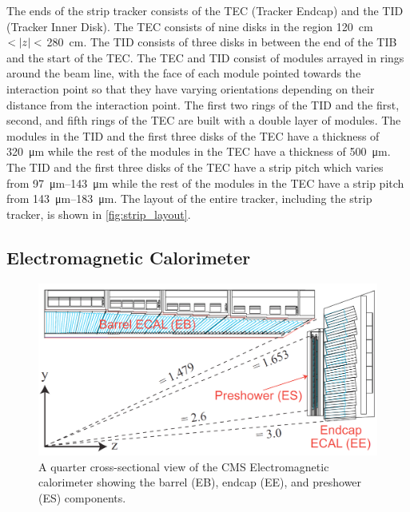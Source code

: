 The ends of the strip tracker consists of the TEC (Tracker Endcap) and the TID
(Tracker Inner Disk). The TEC consists of nine disks in the region
\SI{120}{\centi\meter} $< |z| <$ \SI{280}{\centi\meter}. The TID consists
of three disks in between the end of the TIB and the start of the TEC. The TEC
and TID consist of modules arrayed in rings around the beam line, with the face
of each module pointed towards the interaction point so that they have varying
orientations depending on their distance from the interaction point. The first
two rings of the TID and the first, second, and fifth rings of the TEC are
built with a double layer of modules. The modules in the TID and the first
three disks of the TEC have a thickness of \SI{320}{\micro\meter} while the
rest of the modules in the TEC have a thickness of \SI{500}{\micro\meter}. The
TID and the first three disks of the TEC have a strip pitch which varies from
\SIrange{97}{143}{\micro\meter} while the rest of the modules in the TEC have a
strip pitch from \SIrange{143}{183}{\micro\meter}. The layout of the entire
tracker, including the strip tracker, is shown in \cref{fig:strip_layout}.

\subsection{Electromagnetic Calorimeter}
\label{ssec:ecal}

\begin{figure}[!htbp]
    \centering
    \includegraphics[width=\textwidth]{figures/ecal_layout.png}
    \caption[
        A quarter cross-sectional view of the CMS Electromagnetic calorimeter.
    ]{
        A quarter cross-sectional view of the CMS Electromagnetic calorimeter
        showing the barrel (EB), endcap (EE), and preshower (ES) components.
    }
    \label{fig:ecal_layout}
\end{figure}

